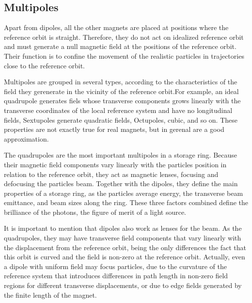 \subsection{Multipoles}

    Apart from dipoles, all the other magnets are placed at positions where the reference orbit is straight. Therefore, they do not act on idealized reference orbit and must generate a null magnetic field at the positions of the reference orbit. Their function is to confine the movement of the realistic particles in trajectories close to the reference orbit.

    Multipoles are grouped in several types, according to the characteristics of the field they gerenerate in the vicinity of the reference orbit.For example, an ideal quadrupole generates fiels whose transverse components grows linearly with the transverse coordinates of the local reference system and have no longitudinal fields, Sextupoles generate quadratic fields, Octupoles, cubic, and so on. These properties are not exactly true for real magnets, but in gerenal are a good approximation.

    The quadrupoles are the most important multipoles in a storage ring. Because their magnetic field components vary linearly with the particles position in relation to the reference orbit, they act as magnetic lenses, focusing and defocusing the particles beam. Together with the dipoles, they define the main properties of a storage ring, as the particles average energy, the transverse beam emittance, and beam sizes along the ring. These three factors combined define the brilliance of the photons, the figure of merit of a light source.

    It is important to mention that dipoles also work as lenses for the beam. As the quadrupoles, they may have transverse field components that vary linearly with the displacement from the reference orbit, being the only differences the fact that this orbit is curved and the field is non-zero at the reference orbit. Actually, even a dipole with uniform field may focus particles, due to the curvature of the reference system that introduces differences in path length in non-zero field regions for different transverse displacements, or due to edge fields generated by the finite length of the magnet.

